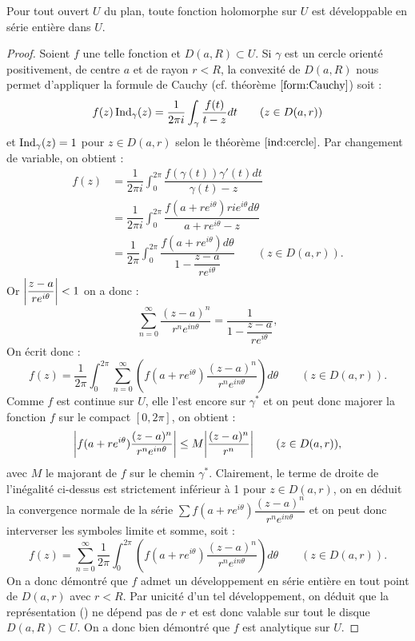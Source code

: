 \begin{thm}
Pour tout ouvert $U$ du plan, toute fonction holomorphe sur $U$ est développable en série entière dans $U$.
\end{thm}

\begin{proof}
Soient $f$ une telle fonction et $D(a, R) \subset U$. 
Si $\gamma$ est un cercle orienté positivement, de centre $a$ et de rayon $r < R$, la convexité de $D(a, R)$ nous permet d'appliquer
la formule de Cauchy (cf. théorème $\ref{form:Cauchy}$) soit :
\[ f(z) \Ind_{\gamma}(z)  = \dfrac1{2\pi i} \int_{\gamma} \dfrac{f(t)}{t-z} dt  \qquad (z \in D(a,r)) \]
et $\Ind_{\gamma}(z) = 1$ pour $z \in D(a,r)$ selon le théorème $\ref{ind:cercle}$.
Par changement de variable, on obtient :
\begin{align*}
f(z) & = \dfrac1{2\pi i} \int_0^{2\pi} \dfrac { f(\gamma(t)) \gamma'(t) dt }{\gamma(t)-z} \\
& = \dfrac1{2\pi i} \int_0^{2\pi} \dfrac { f(a + re^{i\theta}) ri e^{i\theta} d\theta }{a + re^{i\theta}-z} \\
& = \dfrac1{2\pi} \int_0^{2\pi} \dfrac { f(a + re^{i\theta}) d\theta }{1-\dfrac{z-a}{re^{i\theta}}} \qquad (z \in D(a,r)) .
\end{align*}
Or $\abs*{ \dfrac{z-a}{re^{i\theta}} } <1$ on a donc :
\[ \sum_{n=0}^{\infty} \dfrac{(z-a)^n}{r^n e^{in\theta}} = \dfrac1{1-\dfrac{z-a}{re^{i\theta}}} , \]
On écrit donc :
\[ f(z) = \dfrac1{2\pi}  \int_0^{2\pi}  \sum_{n=0}^{\infty} \left ( f(a + re^{i\theta}) \dfrac{(z-a)^n}{r^n e^{in\theta}} \right ) d\theta 
\qquad (z \in D(a,r)) . \]
Comme $f$ est continue sur $U$, elle l'est encore sur $\gamma^{\ast}$ et on peut donc majorer la fonction $f$ sur le compact $[0, 2\pi]$,
on obtient :
\begin{equation}
\abs*{  f(a + re^{i\theta}) \dfrac{(z-a)^n}{r^n e^{in\theta}} } \leq M \abs*{ \dfrac{(z-a)^n}{r^n} } \qquad (z \in D(a,r)) , \label{eq:dse}
\end{equation}
avec $M$ le majorant de $f$ sur le chemin $\gamma^{\ast}$. 
Clairement, le terme de droite de l'inégalité ci-dessus est strictement inférieur à 1 pour $z \in D(a,r)$, 
on en déduit la convergence normale de la série $\sum f(a + re^{i\theta}) \dfrac{(z-a)^n}{r^n e^{in\theta}}$ 
et on peut donc interverser les symboles limite et somme, soit :
\[ f(z) = \sum_{n=0}^{\infty} \dfrac1{2\pi} \int_0^{2\pi} \left ( f(a + re^{i\theta}) \dfrac{(z-a)^n}{r^n e^{in\theta}} \right ) d\theta 
\qquad (z \in D(a,r)) . \]
On a donc démontré que $f$ admet un développement en série entière en tout point de $D(a, r)$ avec $r<R$.
Par unicité d'un tel développement, on déduit que la représentation (\label{eq:dse}) ne dépend pas de $r$ et est donc valable sur
tout le disque $D(a,R) \subset U$. On a donc bien démontré que $f$ est analytique sur $U$.
\end{proof}

